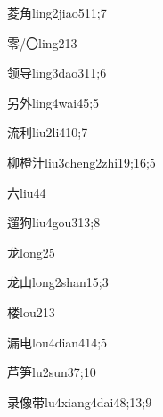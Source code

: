 \begin{verbete}{菱角}{ling2jiao5}{11;7}
\end{verbete}
\begin{verbete}{零/〇}{ling2}{13}
\end{verbete}
\begin{verbete}{领导}{ling3dao3}{11;6}
\end{verbete}
\begin{verbete}{另外}{ling4wai4}{5;5}
\end{verbete}
\begin{verbete}{流利}{liu2li4}{10;7}
\end{verbete}
\begin{verbete}{柳橙汁}{liu3cheng2zhi1}{9;16;5}
\end{verbete}
\begin{verbete}{六}{liu4}{4}
\end{verbete}
\begin{verbete}{遛狗}{liu4gou3}{13;8}
\end{verbete}
\begin{verbete}{龙}{long2}{5}
\end{verbete}
\begin{verbete}{龙山}{long2shan1}{5;3}
\end{verbete}
\begin{verbete}{楼}{lou2}{13}
\end{verbete}
\begin{verbete}{漏电}{lou4dian4}{14;5}
\end{verbete}
\begin{verbete}{芦笋}{lu2sun3}{7;10}
\end{verbete}
\begin{verbete}{录像带}{lu4xiang4dai4}{8;13;9}
\end{verbete}
